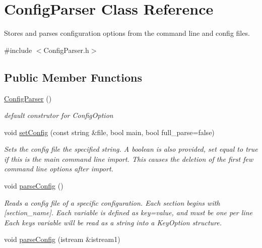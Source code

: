 \hypertarget{class_config_parser}{}\section{Config\+Parser Class Reference}
\label{class_config_parser}


Stores and parses configuration options from the command line and config files.  




{\ttfamily \#include $<$Config\+Parser.\+h$>$}

\subsection*{Public Member Functions}
\begin{DoxyCompactItemize}
\item 
\hyperlink{class_config_parser_adbda5b88fefbabf0986325056bcb0af5}{Config\+Parser} ()\hypertarget{class_config_parser_adbda5b88fefbabf0986325056bcb0af5}{}\label{class_config_parser_adbda5b88fefbabf0986325056bcb0af5}

\begin{DoxyCompactList}\small\item\em default construtor for Config\+Option \end{DoxyCompactList}\item 
void \hyperlink{class_config_parser_adb5c284da827b4034790e50442b6afa0}{set\+Config} (const string \&file, bool main, bool full\+\_\+parse=false)
\begin{DoxyCompactList}\small\item\em Sets the config file the specified string. A boolean is also provided, set equal to true if this is the main command line import. This causes the deletion of the first few command line options after import. \end{DoxyCompactList}\item 
void \hyperlink{class_config_parser_a3daceef1e974a4db49f50ee95fe0e375}{parse\+Config} ()\hypertarget{class_config_parser_a3daceef1e974a4db49f50ee95fe0e375}{}\label{class_config_parser_a3daceef1e974a4db49f50ee95fe0e375}

\begin{DoxyCompactList}\small\item\em Reads a config file of a specific configuration. Each section begins with \textquotesingle{}\mbox{[}section\+\_\+name\mbox{]}\textquotesingle{}. Each variable is defined as \textquotesingle{}key=value\textquotesingle{}, and must be one per line Each key\textquotesingle{}s variable will be read as a string into a Key\+Option structure. \end{DoxyCompactList}\item 
void \hyperlink{class_config_parser_aa9a680f501d90d2addd219f21e631d20}{parse\+Config} (istream \&istream1)\hypertarget{class_config_parser_aa9a680f501d90d2addd219f21e631d20}{}\label{class_config_parser_aa9a680f501d90d2addd219f21e631d20}


\end{DoxyCompactItemize}
